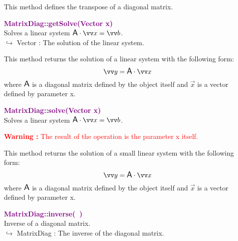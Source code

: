 This method defines the transpose of a diagonal matrix.

\textcolor{purple}{\textbf{MatrixDiag::getSolve(Vector x)}}\label{MatrixDiag::getSolve(Vector x)}\\
Solves a linear system $\A\cdot \overrightarrow{x} = \overrightarrow{b}$.\\ \hspace*{10mm}$\hookrightarrow$ Vector : The solution of the linear system.

This method returns the solution of a linear system with the following form:
\begin{equation*}
\overrightarrow{y} = \A \cdot \overrightarrow{x}
\end{equation*}
where $\mbox{\large\ensuremath{\mathsf{A}}}$ is a diagonal matrix defined by the object itself and $\overrightarrow{x}$ is a vector defined by parameter x.

\textcolor{purple}{\textbf{MatrixDiag::solve(Vector x)}}\label{MatrixDiag::solve(Vector x)}\\
Solves a linear system $\A\cdot \overrightarrow{x} = \overrightarrow{b}$.

\hspace*{10mm}\textcolor{red}{\textbf{Warning :}  The result of the operation is the parameter x itself.}

This method returns the solution of a small linear system with the following form:
\begin{equation*}
\overrightarrow{y} = \A \cdot \overrightarrow{x}
\end{equation*}
where $\mbox{\large\ensuremath{\mathsf{A}}}$ is a diagonal matrix defined by the object itself and $\overrightarrow{x}$ is a vector defined by parameter x.

\textcolor{purple}{\textbf{MatrixDiag::inverse(~)}}\label{MatrixDiag::inverse()}\\
Inverse of a diagonal matrix.\\ \hspace*{10mm}$\hookrightarrow$ MatrixDiag : The inverse of the diagonal matrix.

